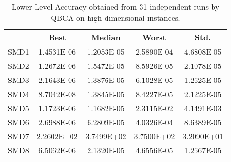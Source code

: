 \documentclass[conference]{IEEEtran}
\theoremstyle{definition}
\begin{document}
\begin{table}[htbp]
    \caption{Lower Level Accuracy obtained from 31 independent runs by QBCA on high-dimensional instances.}
    \label{tab:ll-accur}
    \centering
    \begin{tabular}{ccccc}
        \hline
        & Best &  Median  &  Worst &  Std. \\ \hline

        SMD1 & 1.4531E-06 & 1.2053E-05 %
        & 2.5890E-04 & 4.6808E-05 \\ \hline 
        SMD2 & 1.2672E-06 & 1.5472E-05 %
        & 8.5926E-05 & 2.1078E-05 \\ \hline 
        SMD3 & 2.1643E-06 & 1.3876E-05 %
        & 6.1028E-05 & 1.2625E-05 \\ \hline 
        SMD4 & 8.7042E-08 & 1.3845E-05 %
        & 8.4227E-05 & 2.1225E-05 \\ \hline 
        SMD5 & 1.1723E-06 & 1.1682E-05 %
        & 2.3115E-02 & 4.1491E-03 \\ \hline 
        SMD6 & 2.6988E-06 & 6.2809E-05 %
        & 4.0326E-04 & 8.6389E-05 \\ \hline 
        SMD7 & 2.2602E+02 & 3.7499E+02 %
        & 3.7500E+02 & 3.2090E+01 \\ \hline 
        SMD8 & 6.5062E-06 & 2.1320E-05 %
        & 4.6556E-05 & 1.2667E-05 \\ \hline 

    \end{tabular}
\end{table}
\end{document}
